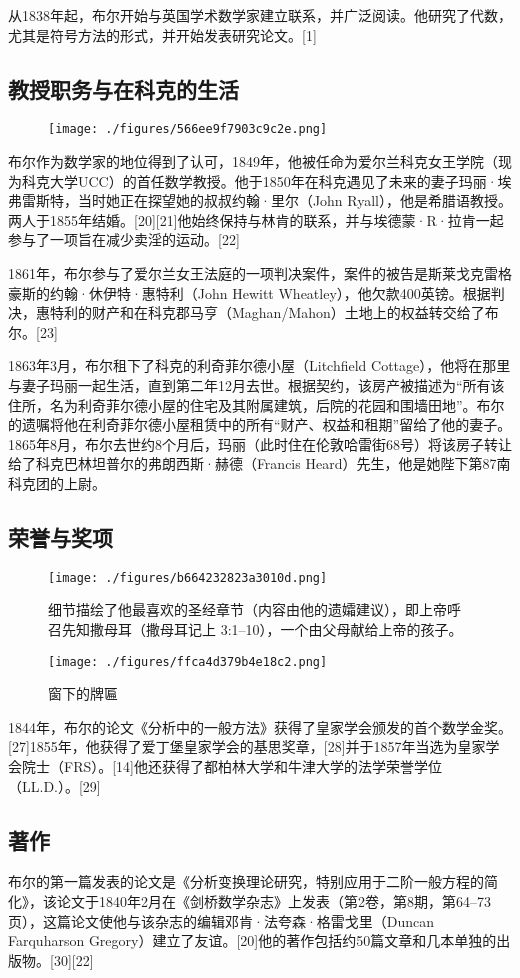 从1838年起，布尔开始与英国学术数学家建立联系，并广泛阅读。他研究了代数，尤其是符号方法的形式，并开始发表研究论文。[1]
\subsection{教授职务与在科克的生活}
\begin{figure}[ht]
\centering
\texttt{[image: ./figures/566ee9f7903c9c2e.png]}
\caption{} \label{fig_George_5}
\end{figure}
布尔作为数学家的地位得到了认可，1849年，他被任命为爱尔兰科克女王学院（现为科克大学UCC）的首任数学教授。他于1850年在科克遇见了未来的妻子玛丽·埃弗雷斯特，当时她正在探望她的叔叔约翰·里尔（John Ryall），他是希腊语教授。两人于1855年结婚。[20][21]他始终保持与林肯的联系，并与埃德蒙·R·拉肯一起参与了一项旨在减少卖淫的运动。[22]

1861年，布尔参与了爱尔兰女王法庭的一项判决案件，案件的被告是斯莱戈克雷格豪斯的约翰·休伊特·惠特利（John Hewitt Wheatley），他欠款400英镑。根据判决，惠特利的财产和在科克郡马亨（Maghan/Mahon）土地上的权益转交给了布尔。[23]

1863年3月，布尔租下了科克的利奇菲尔德小屋（Litchfield Cottage），他将在那里与妻子玛丽一起生活，直到第二年12月去世。根据契约，该房产被描述为“所有该住所，名为利奇菲尔德小屋的住宅及其附属建筑，后院的花园和围墙田地”。布尔的遗嘱将他在利奇菲尔德小屋租赁中的所有“财产、权益和租期”留给了他的妻子。1865年8月，布尔去世约8个月后，玛丽（此时住在伦敦哈雷街68号）将该房子转让给了科克巴林坦普尔的弗朗西斯·赫德（Francis Heard）先生，他是她陛下第87南科克团的上尉。
\subsection{荣誉与奖项}
\begin{figure}[ht]
\centering
\texttt{[image: ./figures/b664232823a3010d.png]}
\caption{细节描绘了他最喜欢的圣经章节（内容由他的遗孀建议），即上帝呼召先知撒母耳（撒母耳记上 3:1–10），一个由父母献给上帝的孩子。} \label{fig_George_6}
\end{figure}
\begin{figure}[ht]
\centering
\texttt{[image: ./figures/ffca4d379b4e18c2.png]}
\caption{窗下的牌匾} \label{fig_George_7}
\end{figure}
1844年，布尔的论文《分析中的一般方法》获得了皇家学会颁发的首个数学金奖。[27]1855年，他获得了爱丁堡皇家学会的基思奖章，[28]并于1857年当选为皇家学会院士（FRS）。[14]他还获得了都柏林大学和牛津大学的法学荣誉学位（LL.D.）。[29]
\subsection{著作}  
布尔的第一篇发表的论文是《分析变换理论研究，特别应用于二阶一般方程的简化》，该论文于1840年2月在《剑桥数学杂志》上发表（第2卷，第8期，第64–73页），这篇论文使他与该杂志的编辑邓肯·法夸森·格雷戈里（Duncan Farquharson Gregory）建立了友谊。[20]他的著作包括约50篇文章和几本单独的出版物。[30][22]

